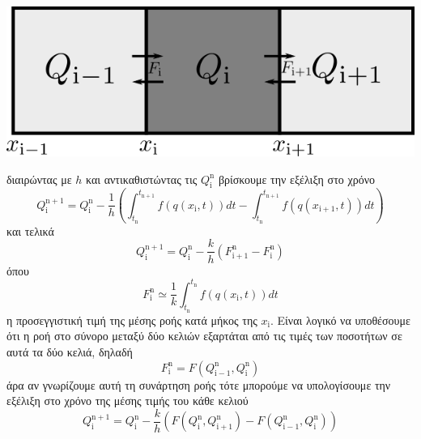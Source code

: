 \begin{marginfigure}
	\centering
	\includegraphics[width=1\linewidth]{Images/FVM}
	\caption{}
	\label{fig:fvm}
\end{marginfigure}


διαιρώντας με $h$ και αντικαθιστώντας τις $Q_{\mathrm{i}}^\mathrm{n}$ βρίσκουμε την εξέλιξη στο χρόνο
\begin{equation}
Q_{\mathrm{i}}^\mathrm{n+1} = Q_{\mathrm{i}}^\mathrm{n} - \frac{1}{h}\left( \int_{t_\mathrm{n}}^{t_\mathrm{n+1}} f(q(x_\mathrm{i},t))dt - \int_{t_\mathrm{n}}^{t_\mathrm{n+1}} f(q(x_\mathrm{i+1},t))dt \right) 
\end{equation}
και τελικά
\begin{equation}
\label{eq:FVM}
Q_{\mathrm{i}}^\mathrm{n+1} = Q_{\mathrm{i}}^\mathrm{n} - \frac{k}{h}\left(F_{\mathrm{i+1}}^\mathrm{n}-F_{\mathrm{i}}^\mathrm{n} \right) 
\end{equation}
όπου 
\begin{equation}
F_{\mathrm{i}}^\mathrm{n} \simeq \frac{1}{k}\int_{t_\mathrm{n}}^{t_\mathrm{n}}f(q(x_\mathrm{i},t))dt 
\end{equation}
η προσεγγιστική τιμή της μέσης ροής κατά μήκος της $x_\mathrm{i}$. Είναι λογικό να υποθέσουμε ότι η ροή στο σύνορο μεταξύ δύο κελιών εξαρτάται από τις τιμές των ποσοτήτων σε αυτά τα δύο κελιά, δηλαδή %
\begin{equation}
F_{\mathrm{i}}^\mathrm{n} = F\left( Q_{\mathrm{i-1}}^\mathrm{n} ,Q_{\mathrm{i}}^\mathrm{n} \right) 
\end{equation}
άρα αν γνωρίζουμε αυτή τη συνάρτηση ροής τότε μπορούμε να υπολογίσουμε την εξέλιξη στο χρόνο της μέσης τιμής του κάθε κελιού
\begin{equation}
Q_{\mathrm{i}}^\mathrm{n+1} = Q_{\mathrm{i}}^\mathrm{n} - \frac{k}{h}\left(
F\left( Q_{\mathrm{i}}^\mathrm{n} ,Q_{\mathrm{i+1}}^\mathrm{n} \right)-
F\left( Q_{\mathrm{i-1}}^\mathrm{n} ,Q_{\mathrm{i}}^\mathrm{n} \right)
 \right) 
\end{equation} 

